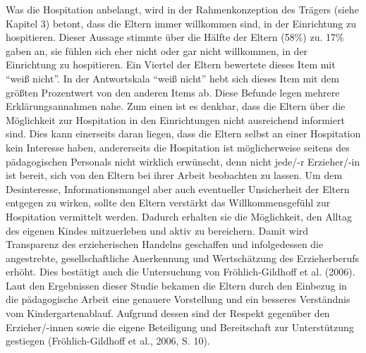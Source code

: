 \documentclass[12pt,a4paper]{article}
\begin{document}
	Was die Hospitation anbelangt, wird in der Rahmenkonzeption des Trägers (siehe Kapitel 3) betont, dass die Eltern immer willkommen sind, in der Einrichtung zu hospitieren. Dieser Aussage stimmte über die Hälfte der Eltern (58\%) zu. 17\% gaben an, sie fühlen sich eher nicht oder gar nicht willkommen, in der Einrichtung zu hospitieren. Ein Viertel der Eltern bewertete dieses Item mit "`weiß nicht"'. In der Antwortskala "`weiß nicht"' hebt sich dieses Item mit dem größten Prozentwert von den anderen Items ab. Diese Befunde legen mehrere Erklä\-rungs\-an\-nah\-men nahe. Zum einen ist es denkbar, dass die Eltern über die Möglichkeit zur Hospitation in den Einrichtungen nicht ausreichend informiert sind. Dies kann einerseits daran liegen, dass die Eltern selbst an einer Hospitation kein Interesse haben, andererseits die Hospitation ist möglicherweise seitens des pädagogischen Personals nicht wirklich erwünscht, denn nicht jede/-r Erzieher/-in ist bereit, sich von den Eltern bei ihrer Arbeit beobachten zu lassen. Um dem Desinteresse, Informationsmangel aber auch eventueller Unsicherheit der Eltern entgegen zu wirken, sollte den Eltern verstärkt das Willkommensgefühl zur Hospitation vermittelt werden. Dadurch erhalten sie die Möglichkeit, den Alltag des eigenen Kindes mitzuerleben und aktiv zu bereichern. Damit wird Transparenz des erzieherischen Handelns geschaffen und infolgedessen die angestrebte, gesellschaftliche Anerkennung und Wertschätzung des Erzieherberufs erhöht. Dies bestätigt auch die Untersuchung von Fröhlich-Gildhoff et al. (2006). Laut den Ergebnissen dieser Studie bekamen die Eltern durch den Einbezug in die pädagogische Arbeit eine genauere Vorstellung und ein besseres Verständnis vom Kindergartenablauf. Aufgrund dessen sind der Respekt gegenüber den Erzieher/-innen sowie die eigene Beteiligung und Bereitschaft zur Unterstützung gestiegen (Fröhlich-Gildhoff et al., 2006, S. 10).
	
\end{document}
